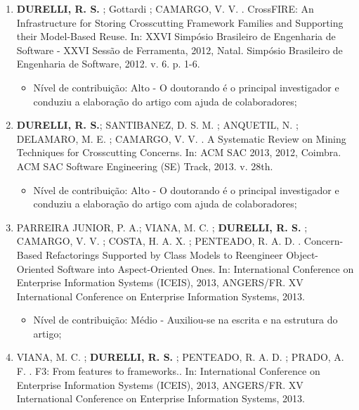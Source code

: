 \begin{itemize}
\begin{enumerate}
	 	\item \textbf{DURELLI, R. S.} ; Gottardi ; CAMARGO, V. V. . CrossFIRE: An Infrastructure for Storing Crosscutting Framework Families and Supporting their Model-Based Reuse. In: XXVI Simpósio Brasileiro de Engenharia de Software - XXVI Sessão de Ferramenta, 2012, Natal. Simpósio Brasileiro de Engenharia de Software, 2012. v. 6. p. 1-6.
	 	            
	 	            \begin{itemize}
			        \item Nível de contribuição: Alto - O doutorando é o principal investigador e conduziu a elaboração do artigo com ajuda de colaboradores;
			    \end{itemize}
	 	
	 	\item \textbf{DURELLI, R. S.}; SANTIBANEZ, D. S. M. ; ANQUETIL, N. ; DELAMARO, M. E. ; CAMARGO, V. V. . A Systematic Review on Mining Techniques for Crosscutting Concerns. In: ACM SAC 2013, 2012, Coimbra. ACM SAC Software Engineering (SE) Track, 2013. v. 28th.
	 	
	 	    \begin{itemize}
			        \item Nível de contribuição: Alto - O doutorando é o principal investigador e conduziu a elaboração do artigo com ajuda de colaboradores;
			    \end{itemize}
	
	 	\item PARREIRA JUNIOR, P. A.; VIANA, M. C. ; \textbf{DURELLI, R. S.} ; CAMARGO, V. V. ; COSTA, H. A. X. ; PENTEADO, R. A. D. . Concern-Based Refactorings Supported by Class Models to Reengineer Object-Oriented Software into Aspect-Oriented Ones. In: International Conference on Enterprise Information Systems (ICEIS), 2013, ANGERS/FR. XV International Conference on Enterprise Information Systems, 2013.
	 	
	 	    \begin{itemize}
			    \item Nível de contribuição: Médio - Auxiliou-se na escrita e na estrutura do artigo;
			    \end{itemize}
		
		\item VIANA, M. C. ; \textbf{DURELLI, R. S.} ; PENTEADO, R. A. D. ; PRADO, A. F. . F3: From features to frameworks.. In: International Conference on Enterprise Information Systems (ICEIS), 2013, ANGERS/FR. XV International Conference on Enterprise Information Systems, 2013.
		    

\end{enumerate}
\end{itemize}

